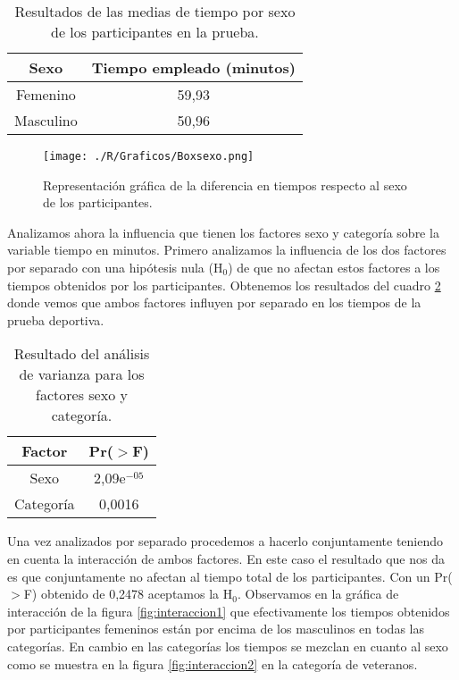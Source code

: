 \documentclass[11pt,a4paper]{article}
\begin{document}
\begin{table}[ht]
\centering
\begin{tabular}{cc}
\toprule[0.4mm]
Sexo & Tiempo empleado (minutos)\\
\midrule
Femenino & 59,93\\
Masculino & 50,96\\
\bottomrule[0.4mm]
\end{tabular}
\caption{Resultados de las medias de tiempo por sexo de los participantes en la prueba.}
\label{tab:sexo}
\end{table}

\begin{figure}
\centering
\texttt{[image: ./R/Graficos/Boxsexo.png]}
\caption{Representación gráfica de la diferencia en tiempos respecto al sexo de los participantes.}
\label{fig:boxsexo}
\end{figure}

Analizamos ahora la influencia que tienen los factores sexo y categoría sobre la variable tiempo en minutos. Primero analizamos la influencia de los dos factores por separado con una hipótesis nula (H$_{0}$) de que no afectan estos factores a los tiempos obtenidos por los participantes. Obtenemos los resultados del cuadro \ref{tab:anova1} donde vemos que ambos factores influyen por separado en los tiempos de la prueba deportiva.

\begin{table}[ht]
\centering
\begin{tabular}{cc}
\toprule[0.4mm]
Factor & Pr($>$F)\\
\midrule
Sexo & 2,09e$^{-05}$\\
Categoría & 0,0016\\
\bottomrule[0.4mm]
\end{tabular}
\caption{Resultado del análisis de varianza para los factores sexo y categoría.}
\label{tab:anova1}
\end{table}

Una vez analizados por separado procedemos a hacerlo conjuntamente teniendo en cuenta la interacción de ambos factores. En este caso el resultado que nos da es que conjuntamente no afectan al tiempo total de los participantes. Con un Pr($>$F) obtenido de 0,2478 aceptamos la H$_{0}$. Observamos en la gráfica de interacción de la figura \ref{fig:interaccion1} que efectivamente los tiempos obtenidos por participantes femeninos están por encima de los masculinos en todas las categorías. En cambio en las categorías los tiempos se mezclan en cuanto al sexo como se muestra en la figura \ref{fig:interaccion2} en la categoría de veteranos.
\end{document}
